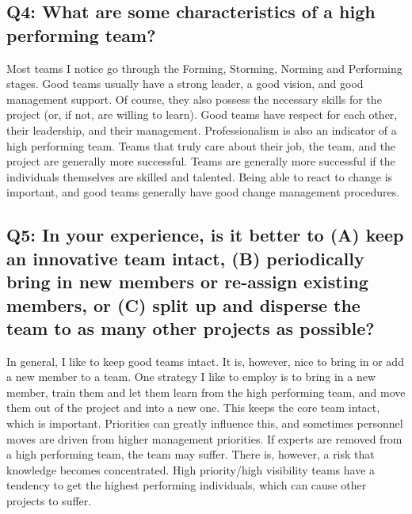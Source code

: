 \subsection*{Q4: What are some characteristics of a high performing team?}
Most teams I notice go through the Forming, Storming, Norming and Performing stages. Good teams usually have a strong leader, a good vision, and good management support. Of course, they also possess the necessary skills for the project (or, if not, are willing to learn). Good teams have respect for each other, their leadership, and their management. Professionalism is also an indicator of a high performing team. Teams that truly care about their job, the team, and the project are generally more successful. Teams are generally more successful if the individuals themselves are skilled and talented. Being able to react to change is important, and good teams generally have good change management procedures.

\subsection*{Q5: In your experience, is it better to (A) keep an innovative team intact, (B) periodically bring in new members or re-assign existing members, or (C) split up and disperse the team to as many other projects as possible?}
In general, I like to keep good teams intact. It is, however, nice to bring in or add a new member to a team. One strategy I like to employ is to bring in a new member, train them and let them learn from the high performing team, and move them out of the project and into a new one. This keeps the core team intact, which is important. Priorities can greatly influence this, and sometimes personnel moves are driven from higher management priorities. If experts are removed from a high performing team, the team may suffer. There is, however, a risk that knowledge becomes concentrated. High priority/high visibility teams have a tendency to get the highest performing individuals, which can cause other projects to suffer. 